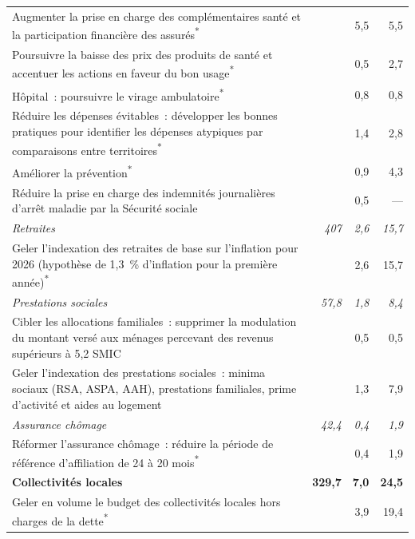 \begin{center}
\begin{minipage}{\textwidth}
\begin{tabularx}{\textwidth}{@{}>{\raggedright\arraybackslash}Xrrr@{}}
    \setlength{\leftskip}{1em} Augmenter la prise en charge des complémentaires santé et la participation financière des assurés\textsuperscript{*} & & 5,5 & 5,5 \\
    \setlength{\leftskip}{1em} Poursuivre la baisse des prix des produits de santé et accentuer les actions en faveur du bon usage\textsuperscript{*} & & 0,5 & 2,7 \\
    \setlength{\leftskip}{1em} Hôpital~: poursuivre le virage ambulatoire\textsuperscript{*} & & 0,8 & 0,8 \\
    \setlength{\leftskip}{1em} Réduire les dépenses évitables~: développer les bonnes pratiques pour identifier les dépenses atypiques par comparaisons entre territoires\textsuperscript{*} & & 1,4 & 2,8 \\
    \setlength{\leftskip}{1em} Améliorer la prévention\textsuperscript{*} & & 0,9 & 4,3 \\
    \setlength{\leftskip}{1em} Réduire la prise en charge des indemnités journalières d'arrêt maladie par la Sécurité sociale & & 0,5 & --- \\
    \textit{Retraites} & \textit{407} & \textit{2,6} & \textit{15,7} \\
    \setlength{\leftskip}{1em} Geler l'indexation des retraites de base sur l'inflation pour 2026 (hypothèse de 1,3~\% d'inflation pour la première année)\textsuperscript{*} & & 2,6 & 15,7 \\
    \textit{Prestations sociales} & \textit{57,8} & \textit{1,8} & \textit{8,4} \\
    \setlength{\leftskip}{1em} Cibler les allocations familiales~: supprimer la modulation du montant versé aux ménages percevant des revenus supérieurs à 5,2 SMIC & & 0,5 & 0,5 \\
    \setlength{\leftskip}{1em} Geler l'indexation des prestations sociales~: minima sociaux (RSA, ASPA, AAH), prestations familiales, prime d'activité et aides au logement & & 1,3 & 7,9 \\
    \textit{Assurance chômage} & \textit{42,4} & \textit{0,4} & \textit{1,9} \\
    \setlength{\leftskip}{1em} Réformer l'assurance chômage~: réduire la période de référence d'affiliation de 24 à 20 mois\textsuperscript{*} & & 0,4 & 1,9 \\
    \midrule
    \textbf{Collectivités locales} & \textbf{329,7} & \textbf{7,0} & \textbf{24,5} \\
    Geler en volume le budget des collectivités locales hors charges de la dette\textsuperscript{*} & & 3,9 & 19,4 \\

\end{tabularx}
\end{minipage}
\end{center}
